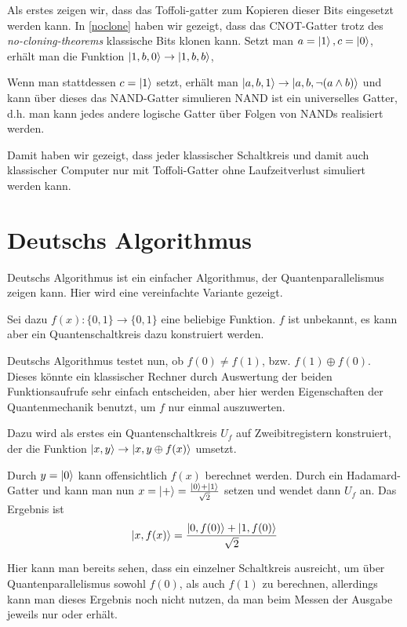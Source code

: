 \documentclass{acm_proc_article-sp}
\begin{document}
Als erstes zeigen wir, dass das Toffoli-gatter zum Kopieren dieser Bits eingesetzt werden kann.
In \ref{noclone} haben wir gezeigt, dass das CNOT-Gatter trotz des \emph{no-cloning-theorems} klassische
Bits klonen kann. 
Setzt man $a = \left|1\right\rangle, c = \left|0\right\rangle$, erhält man die Funktion $\left|1,b,0\right\rangle \rightarrow \left|1,b,b\right\rangle$,

Wenn man stattdessen $c = \left|1\right\rangle$ setzt, erhält man $\left|a,b,1\right\rangle \rightarrow \left|a,b, \neg (a\wedge b)\right\rangle$
und kann über dieses das NAND-Gatter simulieren
NAND ist ein universelles Gatter, d.h. man kann jedes andere logische Gatter über Folgen von NANDs realisiert werden.

Damit haben wir gezeigt, dass jeder klassischer Schaltkreis und damit auch klassischer Computer nur mit Toffoli-Gatter
ohne Laufzeitverlust simuliert werden kann.

\section{Deutschs Algorithmus}
\label{DeutschsAlgo}

Deutschs Algorithmus ist ein einfacher Algorithmus, der Quantenparallelismus zeigen kann. 
Hier wird eine vereinfachte Variante gezeigt.

Sei dazu $ f(x) : \{0,1\} \rightarrow \{0,1\} $ eine beliebige Funktion. $f$ ist unbekannt, es kann aber
ein Quantenschaltkreis dazu konstruiert werden.

Deutschs Algorithmus testet nun, ob $f(0) \neq f(1)$, bzw. $f(1) \oplus f(0)$. Dieses könnte ein klassischer
Rechner durch Auswertung der beiden Funktionsaufrufe sehr einfach entscheiden, aber hier werden Eigenschaften
der Quantenmechanik benutzt, um $f$ nur einmal auszuwerten.

Dazu wird als erstes ein Quantenschaltkreis $U_f$ auf Zweibitregistern konstruiert, der die Funktion 
$\left|x,y\right\rangle \rightarrow \left|x, y \oplus f(x)\right\rangle$ umsetzt. 

Durch $y = \left|0\right\rangle$ kann offensichtlich $f(x)$ berechnet werden. Durch ein Hadamard-Gatter und kann man nun 
$x = \left|+\right\rangle = \frac{\left|0\right\rangle + \left|1\right\rangle}{\sqrt 2}$ setzen
und wendet dann $U_f$ an. Das Ergebnis ist
\[
    \left|x, f(x)\right\rangle = \frac{\left|0, f(0)\right\rangle + \left|1, f(0)\right\rangle}{\sqrt 2}
\]

Hier kann man bereits sehen, dass ein einzelner Schaltkreis ausreicht, um über Quantenparallelismus sowohl $f(0)$, als auch $f(1)$ 
zu berechnen, allerdings kann man dieses Ergebnis noch nicht nutzen, da man beim Messen der Ausgabe jeweils nur  oder
 erhält.
\end{document}
